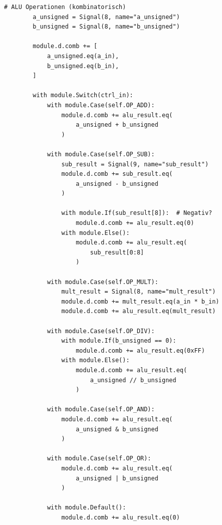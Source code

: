 ﻿\documentclass[12pt,a4paper]{report}
\begin{document}
\begin{lstlisting}[style=pythonstyle, caption={Amaranth ALU-Implementation - Teil 4: ALU-Logik}]
        # ALU Operationen (kombinatorisch)
        a_unsigned = Signal(8, name="a_unsigned")
        b_unsigned = Signal(8, name="b_unsigned")
        
        module.d.comb += [
            a_unsigned.eq(a_in),
            b_unsigned.eq(b_in),
        ]
        
        with module.Switch(ctrl_in):
            with module.Case(self.OP_ADD):
                module.d.comb += alu_result.eq(
                    a_unsigned + b_unsigned
                )
            
            with module.Case(self.OP_SUB):
                sub_result = Signal(9, name="sub_result")
                module.d.comb += sub_result.eq(
                    a_unsigned - b_unsigned
                )
                
                with module.If(sub_result[8]):  # Negativ?
                    module.d.comb += alu_result.eq(0)
                with module.Else():
                    module.d.comb += alu_result.eq(
                        sub_result[0:8]
                    )
            
            with module.Case(self.OP_MULT):
                mult_result = Signal(8, name="mult_result")
                module.d.comb += mult_result.eq(a_in * b_in)
                module.d.comb += alu_result.eq(mult_result)
            
            with module.Case(self.OP_DIV):
                with module.If(b_unsigned == 0):
                    module.d.comb += alu_result.eq(0xFF)
                with module.Else():
                    module.d.comb += alu_result.eq(
                        a_unsigned // b_unsigned
                    )
            
            with module.Case(self.OP_AND):
                module.d.comb += alu_result.eq(
                    a_unsigned & b_unsigned
                )
            
            with module.Case(self.OP_OR):
                module.d.comb += alu_result.eq(
                    a_unsigned | b_unsigned
                )
            
            with module.Default():
                module.d.comb += alu_result.eq(0)
\end{lstlisting}
\end{document}
